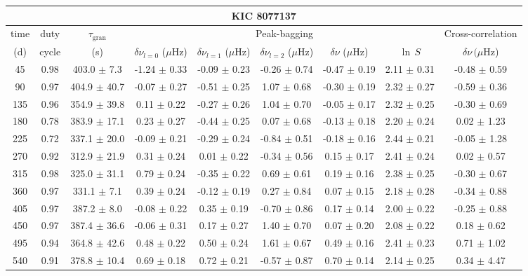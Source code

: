 \documentclass[twocolumn]{aastex61}%
\begin{document}
\begin{table*}[ht]\centering\fontsize{9.}{7.}\selectfont
\begin{tabular}{ccc|ccccc|c}
\multicolumn{9}{c}{KIC 8077137}\\ \hline\hline
time & duty & $\tau_\text{gran}$ &\multicolumn{5}{c|}{Peak-bagging}&Cross-correlation\\
(d)& cycle & (s)&$\delta\nu_{l=0}$ ($\mu$Hz) & $\delta\nu_{l=1}$ ($\mu$Hz) & $\delta\nu_{l=2}$ ($\mu$Hz) & $\delta\nu$ ($\mu$Hz)& $\ln\,S$ & $\delta\nu\,(\mu$Hz)\\\hline
45 & 0.98 & 403.0 $\pm$ 7.3 & -1.24 $\pm$ 0.33 & -0.09 $\pm$ 0.23 & -0.26 $\pm$ 0.74 & -0.47 $\pm$ 0.19 & 2.11 $\pm$ 0.31 & -0.48 $\pm$ 0.59\\
90 & 0.97 & 404.9 $\pm$ 40.7 & -0.07 $\pm$ 0.27 & -0.51 $\pm$ 0.25 & 1.07 $\pm$ 0.68 & -0.30 $\pm$ 0.19 & 2.32 $\pm$ 0.27 & -0.59 $\pm$ 0.36\\
135 & 0.96 & 354.9 $\pm$ 39.8 & 0.11 $\pm$ 0.22 & -0.27 $\pm$ 0.26 & 1.04 $\pm$ 0.70 & -0.05 $\pm$ 0.17 & 2.32 $\pm$ 0.25 & -0.30 $\pm$ 0.69\\
180 & 0.78 & 383.9 $\pm$ 17.1 & 0.23 $\pm$ 0.27 & -0.44 $\pm$ 0.25 & 0.07 $\pm$ 0.68 & -0.13 $\pm$ 0.18 & 2.20 $\pm$ 0.24 & 0.02 $\pm$ 1.23\\
225 & 0.72 & 337.1 $\pm$ 20.0 & -0.09 $\pm$ 0.21 & -0.29 $\pm$ 0.24 & -0.84 $\pm$ 0.51 & -0.18 $\pm$ 0.16 & 2.44 $\pm$ 0.21 & -0.05 $\pm$ 1.28\\
270 & 0.92 & 312.9 $\pm$ 21.9 & 0.31 $\pm$ 0.24 & 0.01 $\pm$ 0.22 & -0.34 $\pm$ 0.56 & 0.15 $\pm$ 0.17 & 2.41 $\pm$ 0.24 & 0.02 $\pm$ 0.57\\
315 & 0.98 & 325.0 $\pm$ 31.1 & 0.79 $\pm$ 0.24 & -0.35 $\pm$ 0.22 & 0.69 $\pm$ 0.61 & 0.19 $\pm$ 0.16 & 2.38 $\pm$ 0.25 & -0.30 $\pm$ 0.67\\
360 & 0.97 & 331.1 $\pm$ 7.1 & 0.39 $\pm$ 0.24 & -0.12 $\pm$ 0.19 & 0.27 $\pm$ 0.84 & 0.07 $\pm$ 0.15 & 2.18 $\pm$ 0.28 & -0.34 $\pm$ 0.88\\
405 & 0.97 & 387.2 $\pm$ 8.0 & -0.08 $\pm$ 0.22 & 0.35 $\pm$ 0.19 & -0.70 $\pm$ 0.86 & 0.17 $\pm$ 0.14 & 2.00 $\pm$ 0.22 & -0.25 $\pm$ 0.88\\
450 & 0.97 & 387.4 $\pm$ 36.6 & -0.06 $\pm$ 0.31 & 0.17 $\pm$ 0.27 & 1.40 $\pm$ 0.70 & 0.07 $\pm$ 0.20 & 2.08 $\pm$ 0.22 & 0.18 $\pm$ 0.62\\
495 & 0.94 & 364.8 $\pm$ 42.6 & 0.48 $\pm$ 0.22 & 0.50 $\pm$ 0.24 & 1.61 $\pm$ 0.67 & 0.49 $\pm$ 0.16 & 2.41 $\pm$ 0.23 & 0.71 $\pm$ 1.02\\
540 & 0.91 & 378.8 $\pm$ 10.4 & 0.69 $\pm$ 0.18 & 0.72 $\pm$ 0.21 & -0.57 $\pm$ 0.87 & 0.70 $\pm$ 0.14 & 2.14 $\pm$ 0.25 & 0.34 $\pm$ 4.47\\

\end{tabular}
\end{table*}
\end{document}
